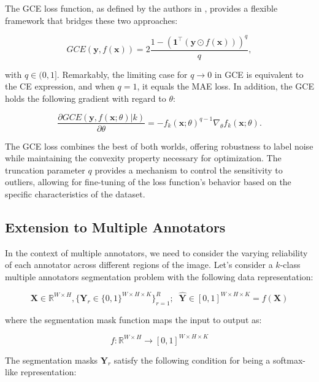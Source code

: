 The GCE loss function, as defined by the authors in
\cite{ZhangEtAl2018}, provides a flexible framework that bridges
these two approaches:

\begin{equation}
  GCE(\mathbf{y}, f(\mathbf{x})) = 2\frac{1 -
  (\mathbf{1}^\top(\mathbf{y} \odot f(\mathbf{x})))^q}{q},
\end{equation}

with $q \in (0,1]$. Remarkably, the limiting case for $q \to 0$ in
GCE is equivalent to the CE expression, and when $q = 1$, it equals
the MAE loss. In addition, the GCE holds the following gradient with
regard to $\theta$:

\begin{equation}
  \frac{\partial GCE(\mathbf{y}, f(\mathbf{x};\theta)|k)}{\partial
  \theta} = -f_k(\mathbf{x};\theta)^{q-1}\nabla_\theta f_k(\mathbf{x};\theta).
\end{equation}

The GCE loss combines the best of both worlds, offering robustness to
label noise while maintaining the convexity property necessary for
optimization. The truncation parameter $q$ provides a mechanism to
control the sensitivity to outliers, allowing for fine-tuning of the
loss function's behavior based on the specific characteristics of the dataset.

\subsection{Extension to Multiple Annotators}

In the context of multiple annotators, we need to consider the
varying reliability of each annotator across different regions of the
image. Let's consider a $k$-class multiple annotators segmentation
problem with the following data representation:

\begin{equation}
  \mathbf X \in \mathbb{R}^{W \times H}, \{ \mathbf Y_r \in
  \{0,1\}^{W \times H \times K} \}_{r=1}^R; \;\; \mathbf {\hat Y} \in
  [0,1]^{W\times H \times K} = f(\mathbf X)
\end{equation}

where the segmentation mask function maps the input to output as:

\begin{equation}
  f: \mathbb  R ^{W\times H} \to [0,1]^{W\times H\times K}
\end{equation}

The segmentation masks $\mathbf Y_r$ satisfy the following condition
for being a softmax-like representation:

